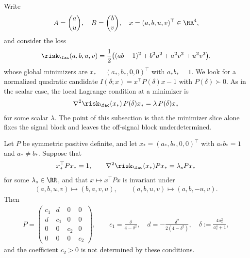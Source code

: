 \documentclass{article}
\begin{document}
Write
\begin{align}
    A=\binom{a}{u}, \quad B=\binom{b}{v}, \quad x=(a,b,u,v)^\top \in \RR^4,
\end{align}
and consider the loss
\begin{align}
    \risk_\fac(a,b,u,v)
    =
    \frac12\bigl((ab-1)^2+b^2u^2+a^2v^2+u^2v^2\bigr),
\end{align}
whose global minimizers are $x_*=(a_*,b_*,0,0)^\top$ with $a_*b_*=1$. We look
for a normalized quadratic candidate $I(\delta; x)=x^\top P(\delta) x - 1$
with $P(\delta)\succ0$. As in the scalar case, the local Lagrange condition at
a minimizer is
\begin{align}
    \nabla^2 \risk_\fac(x_*)\,P(\delta) x_* = \lambda\, P(\delta) x_*
\end{align}
for some scalar $\lambda$. The point of this subsection is that the minimizer
slice alone fixes the signal block and leaves the off-signal block
underdetermined.

\begin{proposition}
\label{prop:diag10_structure}
Let $P$ be symmetric positive definite, and let
$x_*=(a_*,b_*,0,0)^\top$ with $a_*b_*=1$ and $a_* \ne b_*$. Suppose that
\begin{align}
    x_*^\top P x_*=1,
    \qquad
    \nabla^2\risk_\fac(x_*)P x_*=\lambda_s P x_*
\end{align}
for some $\lambda_s\in\RR$, and that $x\mapsto x^\top P x$ is invariant under
\begin{align}
    (a,b,u,v)\mapsto (b,a,v,u),
    \qquad
    (a,b,u,v)\mapsto (a,b,-u,v).
\end{align}
Then
\begin{align}
    P=
    \begin{pmatrix}
        c_1 & d   & 0   & 0\\
        d   & c_1 & 0   & 0\\
        0   & 0   & c_2 & 0\\
        0   & 0   & 0   & c_2
    \end{pmatrix},
    \qquad
    c_1=\frac{\delta}{4-\delta^2},
    \quad
    d=-\frac{\delta^2}{2(4-\delta^2)},
    \quad
    \delta := \frac{4a_*^2}{a_*^4+1},
\end{align}
and the coefficient $c_2>0$ is not determined by these conditions.
\end{proposition}
\end{document}
